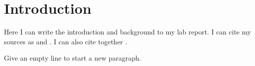 
\section{Introduction}
Here I can write the introduction and background to my lab report.
I can cite my sources as \citep{Hunter:2007} and \citep{Meyer:2012}.
I can also cite together \citep{Meyer:2006, Peek:2011}.

Give an empty line to start a new paragraph.
\blindtext[2]